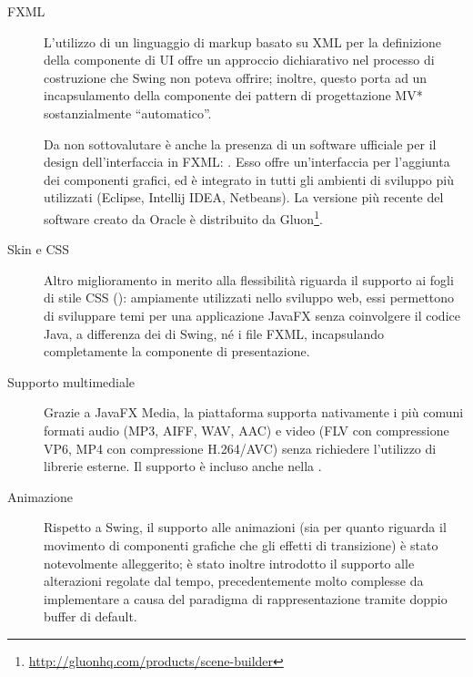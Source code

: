             \begin{description}
                \item [FXML]\label{itm:fxml}
                    L'utilizzo di un linguaggio di markup basato su XML per la definizione della componente di UI offre un approccio dichiarativo nel processo di costruzione che Swing non poteva offrire;
                    inoltre, questo porta ad un incapsulamento della componente  dei pattern di progettazione MV* sostanzialmente ``automatico''.

                    Da non sottovalutare è anche la presenza di un software ufficiale per il design dell'interfaccia in FXML:
                    .
                    Esso offre un'interfaccia  per l'aggiunta dei componenti grafici, ed è integrato in tutti gli ambienti di sviluppo più utilizzati (Eclipse, Intellij IDEA, Netbeans).
                    La versione più recente del software creato da Oracle è distribuito da Gluon\footnote{\url{http://gluonhq.com/products/scene-builder}}.

                \item[Skin e CSS]\label{itm:css}
                    Altro miglioramento in merito alla flessibilità riguarda il supporto ai fogli di stile CSS ():
                    ampiamente utilizzati nello sviluppo web, essi permettono di sviluppare temi per una applicazione JavaFX senza coinvolgere il codice Java, a differenza dei  di Swing, né i file FXML, incapsulando completamente la componente di presentazione.

                \item[Supporto multimediale]\label{itm:media}
                    Grazie a JavaFX Media, la piattaforma supporta nativamente i più comuni formati audio (MP3, AIFF, WAV, AAC) e video (FLV con compressione VP6, MP4 con compressione H.264/AVC) senza richiedere l'utilizzo di librerie esterne.
                    Il supporto è incluso anche nella .

                \item[Animazione]\label{itm:anim}
                    Rispetto a Swing, il supporto alle animazioni (sia per quanto riguarda il movimento di componenti grafiche che gli effetti di transizione) è stato notevolmente alleggerito;
                    è stato inoltre introdotto il supporto alle alterazioni regolate dal tempo, precedentemente molto complesse da implementare a causa del paradigma di rappresentazione tramite doppio buffer di default.


\end{description}
